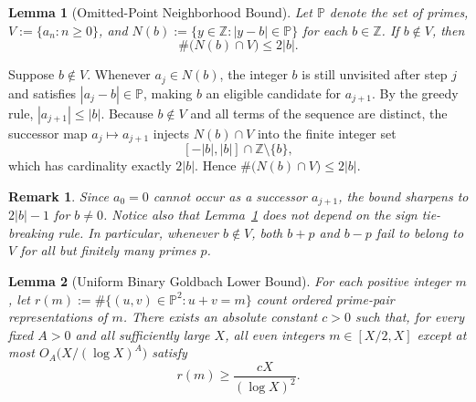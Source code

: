 \documentclass[11pt,a4paper]{article}
\makeatletter
\theoremstyle{entheorem}
\newtheorem{lemma}{Lemma}[section]
\theoremstyle{enremark}
\newtheorem*{remark}{Remark}
\renewenvironment{proof}[1][\proofname]{\par
  \pushQED{\qed}%
  \normalfont\topsep5\p@\@plus4\p@\relax
  \trivlist
  \item[\hskip\labelsep\bfseries\sffamily\color{ink}#1\@addpunct{.}]\ignorespaces
}{%
  \popQED\endtrivlist\@endpefalse
}
\newcommand{\Z}{\mathbb{Z}}
\newcommand{\PP}{\mathbb{P}}
\makeatother
\begin{document}
\begin{lemma}[Omitted-Point Neighborhood Bound]\label{lem:missed}
Let $\PP$ denote the set of primes, $V := \{a_n : n \ge 0\}$, and $N(b) := \{y \in \Z : |y - b| \in \PP\}$ for each $b \in \Z$. If $b \notin V$, then
\begin{equation}\label{eq:missed-bound}
  \#\bigl(N(b) \cap V\bigr) \le 2|b|.
\end{equation}
\end{lemma}

\begin{proof}
Suppose $b \notin V$. Whenever $a_j \in N(b)$, the integer $b$ is still unvisited after step $j$ and satisfies $|a_j - b| \in \PP$, making $b$ an eligible candidate for $a_{j+1}$. By the greedy rule, $|a_{j+1}| \le |b|$. Because $b \notin V$ and all terms of the sequence are distinct, the successor map $a_j \mapsto a_{j+1}$ injects $N(b) \cap V$ into the finite integer set
\[
  [-|b|, |b|] \cap \Z \setminus \{b\},
\]
which has cardinality exactly $2|b|$. Hence $\#\bigl(N(b) \cap V\bigr) \le 2|b|$.
\end{proof}

\begin{remark}
Since $a_0 = 0$ cannot occur as a successor $a_{j+1}$, the bound sharpens to $2|b|-1$ for $b \ne 0$. Notice also that Lemma~\ref{lem:missed} does not depend on the sign tie-breaking rule. In particular, whenever $b \notin V$, both $b+p$ and $b-p$ fail to belong to $V$ for all but finitely many primes $p$.
\end{remark}

\begin{lemma}[Uniform Binary Goldbach Lower Bound]\label{lem:goldbach}
For each positive integer $m$, let $r(m) := \#\{(u,v) \in \PP^2 : u + v = m\}$ count ordered prime-pair representations of $m$. There exists an absolute constant $c > 0$ such that, for every fixed $A > 0$ and all sufficiently large $X$, all even integers $m \in [X/2, X]$ except at most $O_A\bigl(X/(\log X)^A\bigr)$ satisfy
\begin{equation}\label{eq:goldbach-lb}
  r(m) \ge \frac{cX}{(\log X)^2}.
\end{equation}
\end{lemma}
\end{document}
